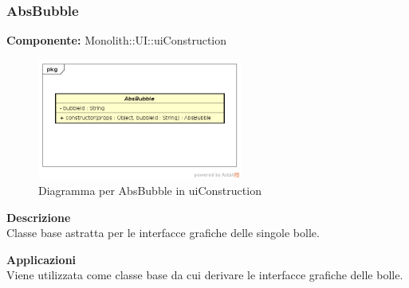 \subsubsection{AbsBubble}
\textbf{Componente:}  Monolith::UI::uiConstruction\\
   \FloatBarrier
   \begin{figure}[ht]
   \centering
   \includegraphics[width=0.6\textwidth]{img/single-AbsBubble}
   \caption{{Diagramma per AbsBubble in uiConstruction}}
\end{figure}
\FloatBarrier
\textbf{Descrizione}\\
Classe base astratta per le interfacce grafiche delle singole bolle. 


\textbf{Applicazioni}\\
Viene utilizzata come classe base da cui derivare le interfacce grafiche delle bolle. 


\clearpage

